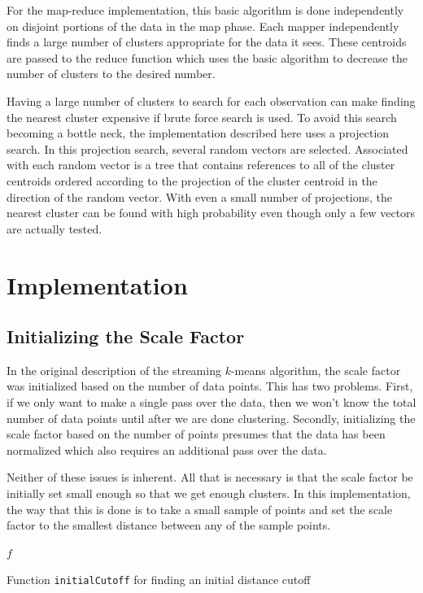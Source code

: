 \documentclass[11pt]{amsart}
\begin{document}
For the map-reduce implementation, this basic algorithm is done independently on disjoint portions of the data in the map phase.  Each mapper independently finds a large number of clusters appropriate for the data it sees.  These centroids are passed to the reduce function which uses the basic algorithm to decrease the number of clusters to the desired number.

Having a large number of clusters to search for each observation can make finding the nearest cluster expensive if brute force search is used.  To avoid this search becoming a bottle neck, the implementation described here uses a projection search.  In this projection search, several random vectors are selected.  Associated with each random vector is a tree that contains references to all of the cluster centroids ordered according to the projection of the cluster centroid in the direction of the random vector.  With even a small number of projections, the nearest cluster can be found with high probability even though only a few vectors are actually tested.

\section{Implementation}
\subsection{Initializing the Scale Factor}
In the original description of the streaming $k$-means algorithm, the scale factor was initialized based on the number of data points.  This has two problems.  First, if we only want to make a single pass over the data, then we won't know the total number of data points until after we are done clustering.  Secondly, initializing the scale factor based on the number of points presumes that the data has been normalized which also requires an additional pass over the data.

Neither of these issues is inherent.  All that is necessary is that the scale factor be initially set small enough so that we get enough clusters.  In this implementation, the way that this is done is to take a small sample of points and set the scale factor to the smallest distance between any of the sample points.

\begin{algorithm}[H]
\SetNoFillComment
{}
\Return $f$
\caption{Function {\tt initialCutoff} for finding an initial distance cutoff}
\end{algorithm}
\end{document}
